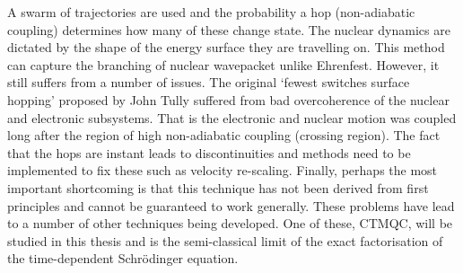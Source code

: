 A swarm of trajectories are used and the probability a hop (non-adiabatic coupling) determines how many of these change state. The nuclear dynamics are dictated by the shape of the energy surface they are travelling on. This method can capture the branching of nuclear wavepacket unlike Ehrenfest. However, it still suffers from a number of issues. The original `fewest switches surface hopping' proposed by John Tully suffered from bad overcoherence of the nuclear and electronic subsystems. That is the electronic and nuclear motion was coupled long after the region of high non-adiabatic coupling (crossing region). The fact that the hops are instant leads to discontinuities and methods need to be implemented to fix these such as velocity re-scaling. Finally, perhaps the most important shortcoming is that this technique has not been derived from first principles and cannot be guaranteed to work generally. These problems have lead to a number of other techniques being developed. One of these, CTMQC, will be studied in this thesis and is the semi-classical limit of the exact factorisation of the time-dependent Schr\"odinger equation.
\clearpage
